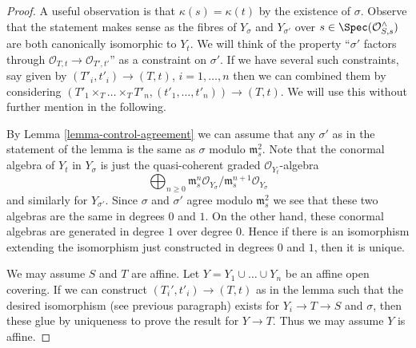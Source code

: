 \begin{proof}
A useful observation is that $\kappa(s) = \kappa(t)$ by the existence of
$\sigma$. Observe that the statement makes sense as the fibres of $Y_\sigma$
and $Y_{\sigma'}$ over $s \in \Spec(\mathcal{O}_{S, s}^\wedge)$
are both canonically isomorphic to $Y_t$. We will think of the property
``$\sigma'$ factors through $\mathcal{O}_{T, t} \to \mathcal{O}_{T', t'}$''
as a constraint on $\sigma'$. If we have several such constraints,
say given by $(T'_i, t'_i) \to (T, t)$, $i = 1, \ldots, n$
then we can combined them by considering
$(T'_1 \times_T \ldots \times_T T'_n, (t'_1, \ldots, t'_n)) \to
(T, t)$. We will use this without further mention in the following.

\medskip\noindent
By Lemma \ref{lemma-control-agreement} we can assume that any $\sigma'$
as in the statement of the lemma is the same as $\sigma$ modulo
$\mathfrak m_s^2$. Note that the conormal algebra of $Y_t$ in
$Y_\sigma$ is just the quasi-coherent graded $\mathcal{O}_{Y_t}$-algebra
$$
\bigoplus\nolimits_{n \geq 0}
\mathfrak m_s^n\mathcal{O}_{Y_\sigma}/
\mathfrak m_s^{n + 1}\mathcal{O}_{Y_\sigma}
$$
and similarly for $Y_{\sigma'}$. Since $\sigma$ and $\sigma'$
agree modulo $\mathfrak m_s^2$ we see that these two algebras
are the same in degrees $0$ and $1$. On the other hand, these
conormal algebras are generated in degree $1$ over degree $0$.
Hence if there is an isomorphism extending the isomorphism
just constructed in degrees $0$ and $1$, then it is unique.

\medskip\noindent
We may assume $S$ and $T$ are affine. Let $Y = Y_1 \cup \ldots \cup Y_n$
be an affine open covering. If we can construct $(T_i', t'_i) \to (T, t)$
as in the lemma such that the desired isomorphism (see previous paragraph)
exists for $Y_i \to T \to S$ and $\sigma$, then these glue by
uniqueness to prove the result for $Y \to T$. Thus we may assume $Y$ is affine.


\end{proof}
